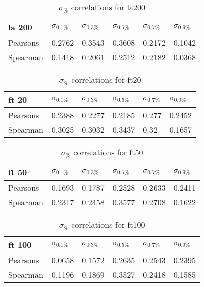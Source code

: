 \documentclass{sig-alternate}
\begin{document}
\begin{table}[h!]
\centering
\caption{$\sigma_{\%}$ correlations for la200}
\begin{tabular}{|l|l|l|l|l|l|}
\hline
la 200 & $\sigma_{0.1\%}$ & $\sigma_{0.3\%}$ & $\sigma_{0.5\%}$ & $\sigma_{0.7\%}$ & $\sigma_{0.9\%}$ \\ \hline
Pearsons  & 0.2762 & 0.3543 & 0.3608 & 0.2172 & 0.1042 \\ \hline
Spearman  & 0.1418 & 0.2061 & 0.2512 & 0.2182 & 0.0368 \\ \hline
\end{tabular}
\end{table}
\begin{table}[h!]
\centering
\caption{$\sigma_{\%}$ correlations for ft20}
\begin{tabular}{|l|l|l|l|l|l|}
\hline
ft 20 & $\sigma_{0.1\%}$ & $\sigma_{0.3\%}$ & $\sigma_{0.5\%}$ & $\sigma_{0.7\%}$ & $\sigma_{0.9\%}$ \\ \hline
Pearsons  & 0.2388 & 0.2277 & 0.2185 & 0.277 & 0.2452 \\ \hline
Spearman  & 0.3025 & 0.3032 & 0.3437 & 0.32 & 0.1657 \\ \hline
\end{tabular}
\end{table}
\begin{table}[h!]
\centering
\caption{$\sigma_{\%}$ correlations for ft50}
\begin{tabular}{|l|l|l|l|l|l|}
\hline
ft 50 & $\sigma_{0.1\%}$ & $\sigma_{0.3\%}$ & $\sigma_{0.5\%}$ & $\sigma_{0.7\%}$ & $\sigma_{0.9\%}$ \\ \hline
Pearsons  & 0.1693 & 0.1787 & 0.2528 & 0.2633 & 0.2411 \\ \hline
Spearman  & 0.2317 & 0.2458 & 0.3577 & 0.2708 & 0.1622 \\ \hline
\end{tabular}
\end{table}
\begin{table}[h!]
\centering
\caption{$\sigma_{\%}$ correlations for ft100}
\begin{tabular}{|l|l|l|l|l|l|}
\hline
ft 100 & $\sigma_{0.1\%}$ & $\sigma_{0.3\%}$ & $\sigma_{0.5\%}$ & $\sigma_{0.7\%}$ & $\sigma_{0.9\%}$ \\ \hline
Pearsons  & 0.0658 & 0.1572 & 0.2635 & 0.2543 & 0.2395 \\ \hline
Spearman  & 0.1196 & 0.1869 & 0.3527 & 0.2418 & 0.1585 \\ \hline
\end{tabular}
\end{table}
\end{document}
